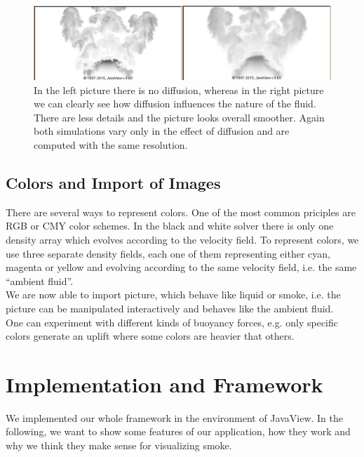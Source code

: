 \documentclass[a4paper,10pt,oneside,final,german,openbib,pdftex,titlepage]{scrbook}
\begin{document}
\begin{figure}[H]
 \centering
 \includegraphics[scale=0.30]{images/Diffusion.png}
 \caption{In the left picture there is no diffusion, whereas in the right picture we can clearly see how diffusion influences the nature of the fluid. There are less details and the picture looks overall smoother. Again both simulations vary only in the effect of diffusion and are computed with the same resolution.}
 \label{ViscosityOnOff}
\end{figure}

\section{Colors and Import of Images}
There are several ways to represent colors. One of the most common priciples are RGB or CMY color schemes. In the black and white solver there is only one density array which evolves according to the velocity field. To represent colors, we use three separate density fields, each one of them representing either cyan, magenta or yellow and evolving according to the same velocity field, i.e. the same ``ambient fluid''.\\

We are now able to import picture, which behave like liquid or smoke, i.e. the picture can be manipulated interactively and behaves like the ambient fluid.\\
One can experiment with different kinds of buoyancy forces, e.g. only specific colors generate an uplift where some colors are heavier that others. 

\chapter{Implementation and Framework}
We implemented our whole framework in the environment of JavaView. In the following, we want to show some features of our application, how they work and why we think they make sense for visualizing smoke.
%
\end{document}
